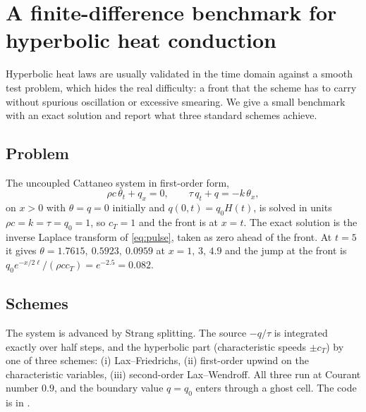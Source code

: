 \section{A finite-difference benchmark for hyperbolic heat conduction}\label{sec:schemes}

Hyperbolic heat laws are usually validated in the time domain against a smooth test problem, which hides the real difficulty: a front that the scheme has to carry without spurious oscillation or excessive smearing. We give a small benchmark with an exact solution and report what three standard schemes achieve.

\subsection{Problem}
The uncoupled Cattaneo system in first-order form,
\begin{equation}
\rho c\,\theta_t+q_x=0,\qquad \tau\,q_t+q=-k\,\theta_x ,
\end{equation}
on $x>0$ with $\theta=q=0$ initially and $q(0,t)=q_0H(t)$, is solved in units $\rho c=k=\tau=q_0=1$, so $c_T=1$ and the front is at $x=t$. The exact solution is the inverse Laplace transform of \cref{eq:pulse}, taken as zero ahead of the front. At $t=5$ it gives $\theta=1.7615,\ 0.5923,\ 0.0959$ at $x=1,\,3,\,4.9$ and the jump at the front is $q_0e^{-x/2\ell}/(\rho cc_T)=e^{-2.5}=0.082$.

\subsection{Schemes}
The system is advanced by Strang splitting. The source $-q/\tau$ is integrated exactly over half steps, and the hyperbolic part (characteristic speeds $\pm c_T$) by one of three schemes: (i) Lax--Friedrichs, (ii) first-order upwind on the characteristic variables, (iii) second-order Lax--Wendroff. All three run at Courant number $0.9$, and the boundary value $q=q_0$ enters through a ghost cell. The code is in .

